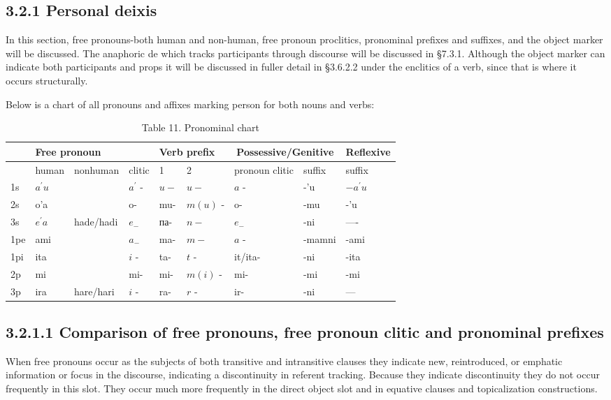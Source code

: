 \documentclass[10pt]{article}
\begin{document}
\subsection*{3.2.1 Personal deixis}
In this section, free pronouns-both human and non-human, free pronoun proclitics, pronominal prefixes and suffixes, and the object marker will be discussed. The anaphoric de which tracks participants through discourse will be discussed in §7.3.1. Although the object marker can indicate both participants and props it will be discussed in fuller detail in §3.6.2.2 under the enclitics of a verb, since that is where it occurs structurally.

Below is a chart of all pronouns and affixes marking person for both nouns and verbs:

\begin{table}[h]
\begin{center}
\captionsetup{labelformat=empty}
\caption{Table 11. Pronominal chart}
\begin{tabular}{|l|l|l|l|l|l|l|l|l|}
\hline
 & \multicolumn{3}{|l|}{Free pronoun} & \multicolumn{2}{|l|}{Verb prefix} & \multicolumn{2}{|c|}{Possessive/Genitive} & Reflexive \\
\hline
 & human & nonhuman & clitic & 1 & 2 & pronoun clitic & suffix & suffix \\
\hline
1s & \(a^{\prime} u\) &  & \(a^{\prime}\) - & \(u-\) & \(u-\) & \(a\) - & -'u & \(-a^{\prime} u\) \\
\hline
2s & o'a &  & o- & mu- & \(m(u)\) - & o- & -mu & -'u \\
\hline
3s & \(e^{\prime} a\) & hade/hadi & \(e_{-}\) & па- & \(n-\) & \(e_{-}\) & -ni & ---- \\
\hline
1pe & ami &  & \(a_{-}\) & ma- & \(m-\) & \(a\) - & -mamni & -ami \\
\hline
1pi & ita &  & \(i\) - & ta- & \(t\) - & it/ita- & -ni & -ita \\
\hline
2p & mi &  & mi- & mi- & \(m(i)\) - & mi- & -mi & -mi \\
\hline
3p & ira & hare/hari & \(i\) - & ra- & \(r\) - & ir- & -ni & --- \\
\hline
\end{tabular}
\end{center}
\end{table}

\subsection*{3.2.1.1 Comparison of free pronouns, free pronoun clitic and pronominal prefixes}
When free pronouns occur as the subjects of both transitive and intransitive clauses they indicate new, reintroduced, or emphatic information or focus in the discourse, indicating a discontinuity in referent tracking. Because they indicate discontinuity they do not occur frequently in this slot. They occur much more frequently in the direct object slot and in equative clauses and topicalization constructions.
\end{document}
